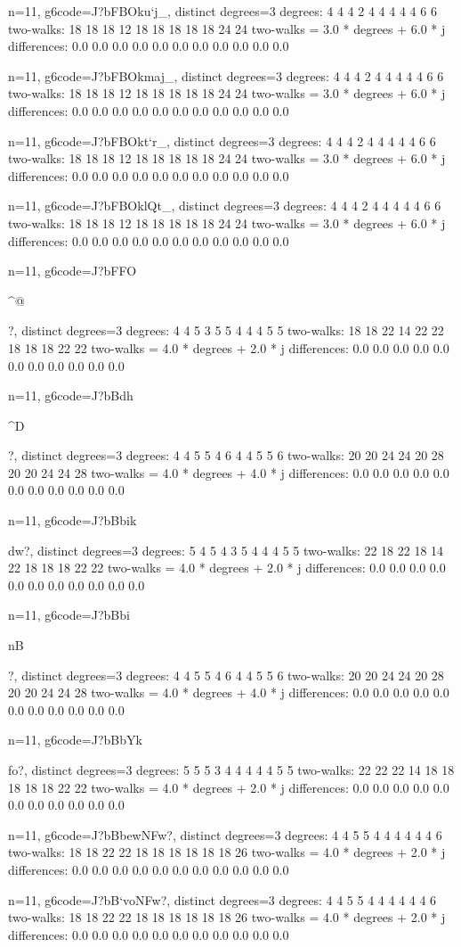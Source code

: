 {{{{{{{{{n=11, g6code=J?bFBOku`j_, distinct degrees=3
degrees: 4 4 4 2 4 4 4 4 4 6 6 
two-walks: 18 18 18 12 18 18 18 18 18 24 24 
two-walks = 3.0 * degrees + 6.0 * j
differences: 0.0 0.0 0.0 0.0 0.0 0.0 0.0 0.0 0.0 0.0 0.0 

n=11, g6code=J?bFBOkmaj_, distinct degrees=3
degrees: 4 4 4 2 4 4 4 4 4 6 6 
two-walks: 18 18 18 12 18 18 18 18 18 24 24 
two-walks = 3.0 * degrees + 6.0 * j
differences: 0.0 0.0 0.0 0.0 0.0 0.0 0.0 0.0 0.0 0.0 0.0 

n=11, g6code=J?bFBOkt`r_, distinct degrees=3
degrees: 4 4 4 2 4 4 4 4 4 6 6 
two-walks: 18 18 18 12 18 18 18 18 18 24 24 
two-walks = 3.0 * degrees + 6.0 * j
differences: 0.0 0.0 0.0 0.0 0.0 0.0 0.0 0.0 0.0 0.0 0.0 

n=11, g6code=J?bFBOklQt_, distinct degrees=3
degrees: 4 4 4 2 4 4 4 4 4 6 6 
two-walks: 18 18 18 12 18 18 18 18 18 24 24 
two-walks = 3.0 * degrees + 6.0 * j
differences: 0.0 0.0 0.0 0.0 0.0 0.0 0.0 0.0 0.0 0.0 0.0 

n=11, g6code=J?bFFO{^@{?, distinct degrees=3
degrees: 4 4 5 3 5 5 4 4 4 5 5 
two-walks: 18 18 22 14 22 22 18 18 18 22 22 
two-walks = 4.0 * degrees + 2.0 * j
differences: 0.0 0.0 0.0 0.0 0.0 0.0 0.0 0.0 0.0 0.0 0.0 

n=11, g6code=J?bBdh{^D{?, distinct degrees=3
degrees: 4 4 5 5 4 6 4 4 5 5 6 
two-walks: 20 20 24 24 20 28 20 20 24 24 28 
two-walks = 4.0 * degrees + 4.0 * j
differences: 0.0 0.0 0.0 0.0 0.0 0.0 0.0 0.0 0.0 0.0 0.0 

n=11, g6code=J?bBbik{dw?, distinct degrees=3
degrees: 5 4 5 4 3 5 4 4 4 5 5 
two-walks: 22 18 22 18 14 22 18 18 18 22 22 
two-walks = 4.0 * degrees + 2.0 * j
differences: 0.0 0.0 0.0 0.0 0.0 0.0 0.0 0.0 0.0 0.0 0.0 

n=11, g6code=J?bBbi{nB{?, distinct degrees=3
degrees: 4 4 5 5 4 6 4 4 5 5 6 
two-walks: 20 20 24 24 20 28 20 20 24 24 28 
two-walks = 4.0 * degrees + 4.0 * j
differences: 0.0 0.0 0.0 0.0 0.0 0.0 0.0 0.0 0.0 0.0 0.0 

n=11, g6code=J?bBbYk{fo?, distinct degrees=3
degrees: 5 5 5 3 4 4 4 4 4 5 5 
two-walks: 22 22 22 14 18 18 18 18 18 22 22 
two-walks = 4.0 * degrees + 2.0 * j
differences: 0.0 0.0 0.0 0.0 0.0 0.0 0.0 0.0 0.0 0.0 0.0 

n=11, g6code=J?bBbewNFw?, distinct degrees=3
degrees: 4 4 5 5 4 4 4 4 4 4 6 
two-walks: 18 18 22 22 18 18 18 18 18 18 26 
two-walks = 4.0 * degrees + 2.0 * j
differences: 0.0 0.0 0.0 0.0 0.0 0.0 0.0 0.0 0.0 0.0 0.0 

n=11, g6code=J?bB`voNFw?, distinct degrees=3
degrees: 4 4 5 5 4 4 4 4 4 4 6 
two-walks: 18 18 22 22 18 18 18 18 18 18 26 
two-walks = 4.0 * degrees + 2.0 * j
differences: 0.0 0.0 0.0 0.0 0.0 0.0 0.0 0.0 0.0 0.0 0.0 

}}}}}}}}}}}}}}}}}
